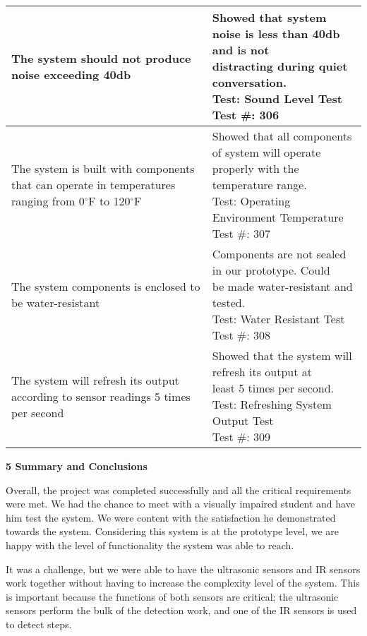 \begin{table}[h]
\begin{tabular}{|m{5cm}|m{8cm}|}
The system should not produce noise exceeding 40db & 
\makecell[l]{
Showed that system noise is less than 40db and is not \\
distracting during quiet conversation.\\
Test: Sound Level Test\\
Test \#: 306} \\ \hline

The system is built with components that can operate in temperatures
ranging from 0$^\circ$F to 120$^\circ$F & 
\makecell[l]{
Showed that all components of system will operate \\
properly with the temperature range.\\
Test: Operating Environment Temperature\\
Test \#: 307} \\ \hline

The system components is enclosed to be water-resistant & 
\makecell[l]{
Components are not sealed in our prototype. Could \\
be made water-resistant and tested.\\
Test: Water Resistant Test\\
Test \#: 308} \\ \hline

The system will refresh its output according to sensor readings 5 times
per second & 
\makecell[l]{
Showed that the system will refresh its output at \\
least 5 times per second.\\
Test: Refreshing System Output Test\\
Test \#: 309} \\ \hline
\end{tabular}
\end{table}



\textbf{5 Summary and Conclusions}

Overall, the project was completed successfully and all the critical
requirements were met. We had the chance to meet with a visually
impaired student and have him test the system. We were content with the
satisfaction he demonstrated towards the system. Considering this system
is at the prototype level, we are happy with the level of functionality
the system was able to reach.

It was a challenge, but we were able to have the ultrasonic sensors and
IR sensors work together without having to increase the complexity level
of the system. This is important because the functions of both sensors
are critical; the ultrasonic sensors perform the bulk of the detection
work, and one of the IR sensors is used to detect steps.

